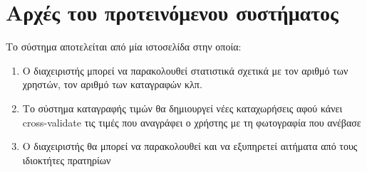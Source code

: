 \section{Αρχές του προτεινόμενου συστήματος}

Το σύστημα αποτελείται από μία ιστοσελίδα στην οποία:
\begin{enumerate}
	\item Ο διαχειριστής μπορεί να παρακολουθεί στατιστικά σχετικά με τον αριθμό των χρηστών, τον αριθμό των καταγραφών κλπ.
	\item Το σύστημα καταγραφής τιμών θα δημιουργεί νέες καταχωρήσεις αφού κάνει cross-validate τις τιμές που αναγράφει ο χρήστης με τη φωτογραφία που ανέβασε
	\item Ο διαχειριστής θα μπορεί να παρακολουθεί και να εξυπηρετεί αιτήματα από τους ιδιοκτήτες πρατηρίων
\end{enumerate}

